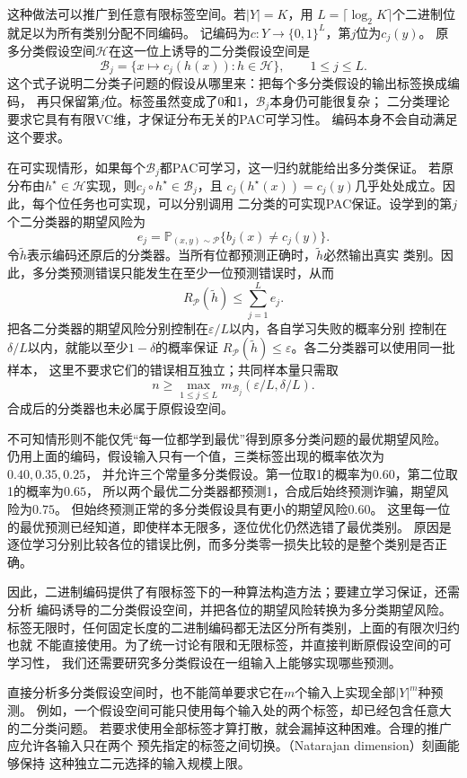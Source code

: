 这种做法可以推广到任意有限标签空间。若$|Y|=K$，用
$L=\lceil\log_2K\rceil$个二进制位就足以为所有类别分配不同编码。
记编码为$c:Y\to\{0,1\}^L$，第$j$位为$c_j(y)$。
原多分类假设空间$\mathcal H$在这一位上诱导的二分类假设空间是
\[
 \mathcal B_j=\{x\mapsto c_j(h(x)):h\in\mathcal H\},\qquad 1\leq j\leq L.
\]
这个式子说明二分类子问题的假设从哪里来：把每个多分类假设的输出标签换成编码，
再只保留第$j$位。标签虽然变成了0和1，$\mathcal B_j$本身仍可能很复杂；
二分类理论要求它具有有限VC维，才保证分布无关的PAC可学习性。
编码本身不会自动满足这个要求。

在可实现情形，如果每个$\mathcal B_j$都PAC可学习，这一归约就能给出多分类保证。
若原分布由$h^\star\in\mathcal H$实现，则$c_j\circ h^\star\in\mathcal B_j$，且
$c_j(h^\star(x))=c_j(y)$几乎处处成立。因此，每个位任务也可实现，可以分别调用
二分类的可实现PAC保证。设学到的第$j$个二分类器的期望风险为
\[
 e_j=\mathbb P_{(x,y)\sim\mathcal P}\{b_j(x)\neq c_j(y)\}.
\]
令$\tilde h$表示编码还原后的分类器。当所有位都预测正确时，$\tilde h$必然输出真实
类别。因此，多分类预测错误只能发生在至少一位预测错误时，从而
\[
 R_{\mathcal P}(\tilde h)\leq\sum_{j=1}^L e_j.
\]
把各二分类器的期望风险分别控制在$\varepsilon/L$以内，各自学习失败的概率分别
控制在$\delta/L$以内，就能以至少$1-\delta$的概率保证
$R_{\mathcal P}(\tilde h)\leq\varepsilon$。各二分类器可以使用同一批样本，
这里不要求它们的错误相互独立；共同样本量只需取
\[
 n\geq\max_{1\leq j\leq L}
 m_{\mathcal B_j}(\varepsilon/L,\delta/L).
\]
合成后的分类器也未必属于原假设空间。

不可知情形则不能仅凭“每一位都学到最优”得到原多分类问题的最优期望风险。
仍用上面的编码，假设输入只有一个值，三类标签出现的概率依次为$0.40,0.35,0.25$，
并允许三个常量多分类假设。第一位取1的概率为$0.60$，第二位取1的概率为$0.65$，
所以两个最优二分类器都预测1，合成后始终预测诈骗，期望风险为$0.75$。
但始终预测正常的多分类假设具有更小的期望风险$0.60$。
这里每一位的最优预测已经知道，即使样本无限多，逐位优化仍然选错了最优类别。
原因是逐位学习分别比较各位的错误比例，而多分类零一损失比较的是整个类别是否正确。

因此，二进制编码提供了有限标签下的一种算法构造方法；要建立学习保证，还需分析
编码诱导的二分类假设空间，并把各位的期望风险转换为多分类期望风险。
标签无限时，任何固定长度的二进制编码都无法区分所有类别，上面的有限次归约也就
不能直接使用。为了统一讨论有限和无限标签，并直接判断原假设空间的可学习性，
我们还需要研究多分类假设在一组输入上能够实现哪些预测。

直接分析多分类假设空间时，也不能简单要求它在$m$个输入上实现全部$|Y|^m$种预测。
例如，一个假设空间可能只使用每个输入处的两个标签，却已经包含任意大的二分类问题。
若要求使用全部标签才算打散，就会漏掉这种困难。合理的推广应允许各输入只在两个
预先指定的标签之间切换。（Natarajan dimension）刻画能够保持
这种独立二元选择的输入规模上限。

